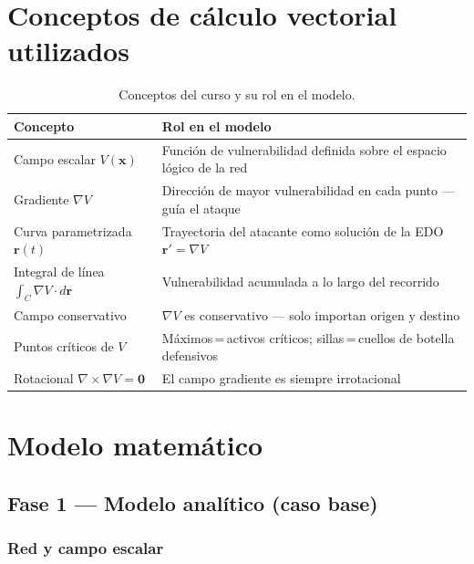 \documentclass[12pt,a4paper]{article}
\newcommand{\grad}{\nabla}
\begin{document}
\section{Conceptos de cálculo vectorial utilizados}

\begin{table}[H]
  \centering
  \caption{Conceptos del curso y su rol en el modelo.}
  \begin{tabular}{@{}p{5.5cm}p{8.5cm}@{}}
    \toprule
    Concepto & Rol en el modelo \\
    \midrule
    Campo escalar $V(\mathbf{x})$
      & Función de vulnerabilidad definida sobre el espacio lógico de la red \\
    Gradiente $\grad V$
      & Dirección de mayor vulnerabilidad en cada punto --- guía el ataque \\
    Curva parametrizada $\mathbf{r}(t)$
      & Trayectoria del atacante como solución de la EDO $\mathbf{r}'=\grad V$ \\
    Integral de línea $\int_C \grad V\cdot d\mathbf{r}$
      & Vulnerabilidad acumulada a lo largo del recorrido \\
    Campo conservativo
      & $\grad V$ es conservativo --- solo importan origen y destino \\
    Puntos críticos de $V$
      & Máximos\,=\,activos críticos; sillas\,=\,cuellos de botella defensivos \\
    Rotacional $\grad\times\grad V=\mathbf{0}$
      & El campo gradiente es siempre irrotacional \\
    \bottomrule
  \end{tabular}
\end{table}

\section{Modelo matemático}
\label{sec:modelo}

\subsection{Fase 1 --- Modelo analítico (caso base)}

\subsubsection{Red y campo escalar}
\end{document}

